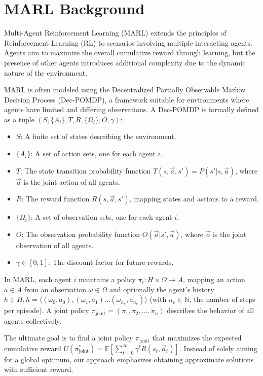 \documentclass[conference]{IEEEtran}
\begin{document}
\section{MARL Background}\label{sec:marl_background}

Multi-Agent Reinforcement Learning (MARL) extends the principles of Reinforcement Learning (RL) to scenarios involving multiple interacting agents. Agents aim to maximize the overall cumulative reward through learning, but the presence of other agents introduces additional complexity due to the dynamic nature of the environment.

MARL is often modeled using the Decentralized Partially Observable Markov Decision Process (Dec-POMDP), a framework suitable for environments where agents have limited and differing observations. A Dec-POMDP is formally defined as a tuple $(S, \{A_i\}, T, R, \{\Omega_i\}, O, \gamma)$:

\begin{itemize}
    \item $S$: A finite set of states describing the environment.
    \item $\{A_i\}$: A set of action sets, one for each agent $i$.
    \item $T$: The state transition probability function $T(s, \vec{a}, s') = P(s'|s, \vec{a})$, where $\vec{a}$ is the joint action of all agents.
    \item $R$: The reward function $R(s, \vec{a}, s')$, mapping states and actions to a reward.
    \item $\{\Omega_i\}$: A set of observation sets, one for each agent $i$.
    \item $O$: The observation probability function $O(\vec{o} | s', \vec{a})$, where $\vec{o}$ is the joint observation of all agents.
    \item $\gamma \in [0,1]$: The discount factor for future rewards.
\end{itemize}

In MARL, each agent $i$ maintains a policy $\pi_i: H \times \Omega \rightarrow A$, mapping an action $a \in A$ from an observation $\omega \in \Omega$ and optionally the agent's history $h \in H, h=\langle(\omega_0,a_0),(\omega_1,a_1)\dots(\omega_{n_e},a_{n_e})\rangle$ (with $n_e \in \mathbb{N}$, the number of steps per episode). A joint policy $\pi_{\text{joint}} = (\pi_1, \pi_2, \ldots, \pi_n)$ describes the behavior of all agents collectively.

The ultimate goal is to find a joint policy $\pi_{\text{joint}}$ that maximizes the expected cumulative reward $U(\pi^*_{\text{joint}}) = \mathbb{E}\left[\sum_{t=0}^{\infty} \gamma^t R(s_t, \vec{a}_t)\right]$. Instead of solely aiming for a global optimum, our approach emphasizes obtaining approximate solutions with sufficient reward.
\end{document}
